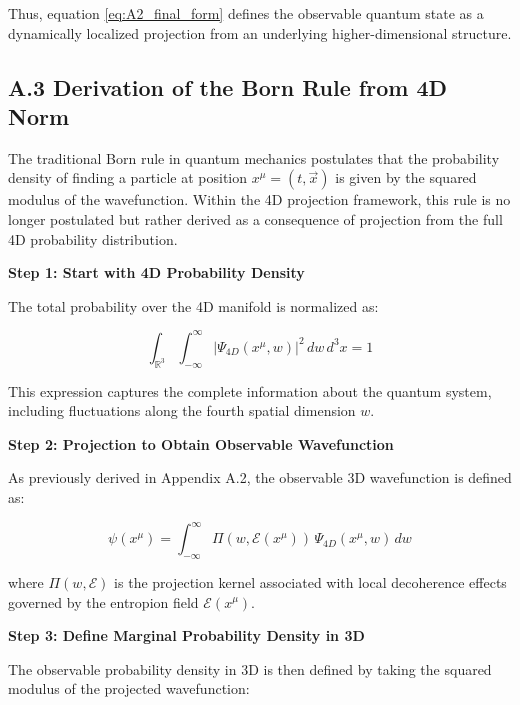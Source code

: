 \documentclass[12pt]{article}
\begin{document}
Thus, equation \eqref{eq:A2_final_form} defines the observable quantum state as a dynamically localized projection from an underlying higher-dimensional structure.


\subsection*{A.3 \quad Derivation of the Born Rule from 4D Norm}
\label{eq:A3}

The traditional Born rule in quantum mechanics postulates that the probability density of finding a particle at position \(x^\mu = (t, \vec{x})\) is given by the squared modulus of the wavefunction. Within the 4D projection framework, this rule is no longer postulated but rather derived as a consequence of projection from the full 4D probability distribution.

\vspace{1em}
\noindent
\textbf{Step 1: Start with 4D Probability Density}

The total probability over the 4D manifold is normalized as:

\begin{equation}
\int_{\mathbb{R}^3} \int_{-\infty}^{\infty} |\Psi_{4D}(x^\mu, w)|^2 \, dw\, d^3x = 1
\label{eq:A3_norm_4d}
\end{equation}

This expression captures the complete information about the quantum system, including fluctuations along the fourth spatial dimension \(w\).

\vspace{1em}
\noindent
\textbf{Step 2: Projection to Obtain Observable Wavefunction}

As previously derived in Appendix A.2, the observable 3D wavefunction is defined as:

\begin{equation}
\psi(x^\mu) = \int_{-\infty}^{\infty} \Pi(w, \mathcal{E}(x^\mu))\, \Psi_{4D}(x^\mu, w)\, dw
\label{eq:A3_proj_def}
\end{equation}

where \(\Pi(w, \mathcal{E})\) is the projection kernel associated with local decoherence effects governed by the entropion field \(\mathcal{E}(x^\mu)\).

\vspace{1em}
\noindent
\textbf{Step 3: Define Marginal Probability Density in 3D}

The observable probability density in 3D is then defined by taking the squared modulus of the projected wavefunction:
\end{document}
